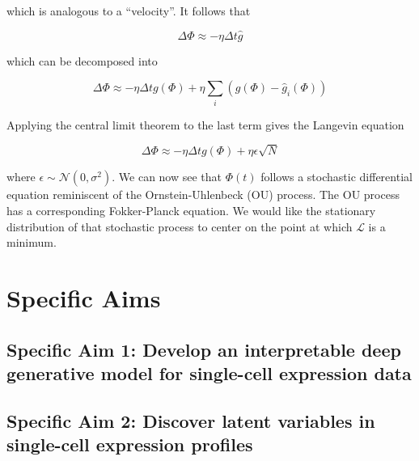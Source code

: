 \documentclass{article}
\begin{document}
which is analogous to a ``velocity''. It follows that 


\begin{equation*}
\Delta\Phi \approx - \eta \Delta t \hat{g}
\end{equation*}

which can be decomposed into 

\begin{equation*}
\Delta\Phi \approx - \eta \Delta t g(\Phi) + \eta \sum_{i} (g(\Phi) - \hat{g}_{i}(\Phi))
\end{equation*}

Applying the central limit theorem to the last term gives the Langevin equation

\begin{equation*}
\Delta\Phi \approx - \eta \Delta t g(\Phi) + \eta \epsilon \sqrt{N}
\end{equation*}

where $\epsilon \sim \mathcal{N}(0,\sigma^{2})$. We can now see that $\Phi(t)$ follows a stochastic differential equation reminiscent of the Ornstein-Uhlenbeck (OU) process. The OU process has a corresponding Fokker-Planck equation. We would like the stationary distribution of that stochastic process to center on the point at which $\mathcal{L}$ is a minimum.



\section{Specific Aims}

\subsection{Specific Aim 1: Develop an interpretable deep generative model for single-cell expression data}


\subsection{Specific Aim 2: Discover latent variables in single-cell expression profiles   }
\end{document}
